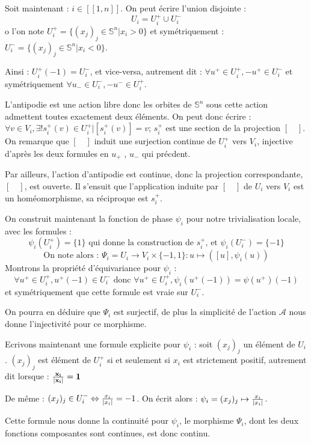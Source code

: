 \begin{exem}
\medskip
Soit maintenant : $i \in [\![1,n]\!]$. On peut \'ecrire l'union disjointe :
\[U_i = U_i^+ \cup U_i^-\]
o l'on note $U_i^+ = \{ (x_j)_j \in \mathbb{S}^n | x_i > 0 \}$ et sym\'etriquement : $U_i^- = \{ (x_j)_j \in \mathbb{S}^n | x_i < 0 \}$.
\par
Ainsi : $U_i^+(-1) = U_i^-$, et vice-versa, autrement dit : $\forall u^+ \in U_i^+ , -u^+ \in U_i^-$ et sym\'etriquement $\forall u_- \in U_i^- , -u^- \in U_i^+$.
\par
L'antipodie est une action libre donc les orbites de $\mathbb{S}^n$ sous cette action admettent toutes exactement deux \'el\'ements. %
On peut donc écrire : $\forall v \in V_i , \exists ! s_i^+(v) \in U_i^+ | [s_i^+(v)] = v$; $s_i^+$ est une section de la projection $[\quad]$. %
On remarque que $[\quad]$ induit une surjection continue de $U_i^+$ vers $V_i$, injective d'après les deux formules en $u_+$ , $u_-$ qui pr\'ecdent.
\par
Par ailleurs, l'action d'antipodie est continue, donc la projection correspondante, $[\quad]$, est ouverte. %
Il s'ensuit que l'application induite par $[\quad]$ de $U_i$ vers $V_i$ est un homéomorphisme, sa réciproque est $s_i^+$.
\par
On construit maintenant la fonction de phase $\psi_i$ pour notre trivialisation locale, avec les formules :
\[\psi_i(U_i^+) = \{1\}\text{ qui donne la construction de $s_i^+$, et }\psi_i(U_i^-) = \{ -1 \}\]
\[\text{On note alors : }\Psi_i = U_i \rightarrow V_i \times \{ -1 , 1 \} : u \mapsto ([u],\psi_i(u))\]
Montrons la propriété d'équivariance pour $\psi_i$ :
\[\forall u^+ \in U_i^+ , u^+ (-1) \in U_i^-\text{ donc }\forall u^+ \in U_i^+ , \psi_i (u^+ (-1)) = \psi(u^+)(-1)\]
et symétriquement que cette formule est vraie sur $U_i^-$.
\par
On pourra en d\'eduire que $\Psi_i$ est surjectif, de plus la simplicité de l'action $\mathcal{A}$ nous donne l'injectivité pour ce morphisme.
\par
Ecrivons maintenant une formule explicite pour $\psi_i$  : soit $(x_j)_j$ un \'el\'ement de $U_i$. $(x_j)_j$ est élément de $U_i^+$ si et seulement si $x_i$ est strictement positif, %
autrement dit lorsque : $\mathbf{\frac{x_i}{\lvert x_i\rvert} = 1}$
\par
De m\^eme : $(x_j)_j \in U_i^- \Leftrightarrow \frac{x_i}{\lvert x_i\rvert} = -1$. %
On écrit alors : $\psi_i = (x_j)_j \mapsto \frac{x_i}{\lvert x_i\rvert}$.
\par
Cette formule nous donne la continuit\'e pour $\psi_i$, le morphisme $\Psi_i$, dont les deux fonctions composantes sont continues, est donc continu.

\end{exem}
